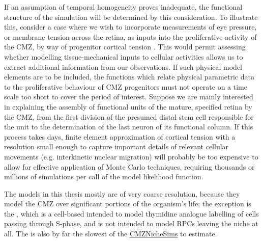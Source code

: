 If an assumption of temporal homogeneity proves inadequate, the functional structure of the simulation will be determined by this consideration. To illustrate this, consider a case where we wish to incorporate measurements of eye pressure, or membrane tension across the retina, as inputs into the proliferative activity of the CMZ, by way of progenitor cortical tension \cite{Winklbauer2015}. This would permit assessing whether modelling tissue-mechanical inputs to cellular activities allows us to extract additional information from our observations. If such physical model elements are to be included, the functions which relate physical parametric data to the proliferative behaviour of CMZ progenitors must not operate on a time scale too short to cover the period of interest. Suppose we are mainly interested in explaining the assembly of functional units of the mature, specified retina by the CMZ, from the first division of the presumed distal stem cell responsible for the unit to the determination of the last neuron of its functional column. If this process takes days, finite element approximation of cortical tension with a resolution small enough to capture important details of relevant cellular movements (e.g. interkinetic nuclear migration) will probably be too expensive to allow for effective application of Monte Carlo techniques, requiring thousands or millions of simulations per call of the model likelihood function.

The models in this thesis mostly are of very coarse resolution, because they model the CMZ over significant portions of the organism's life; the exception is the , which is a cell-based intended to model thymidine analogue labelling of cells passing through S-phase, and is not intended to model RPCs leaving the niche at all. The  is also by far the slowest of the \hyperref[chap:CNS]{CMZNicheSims} to estimate.

